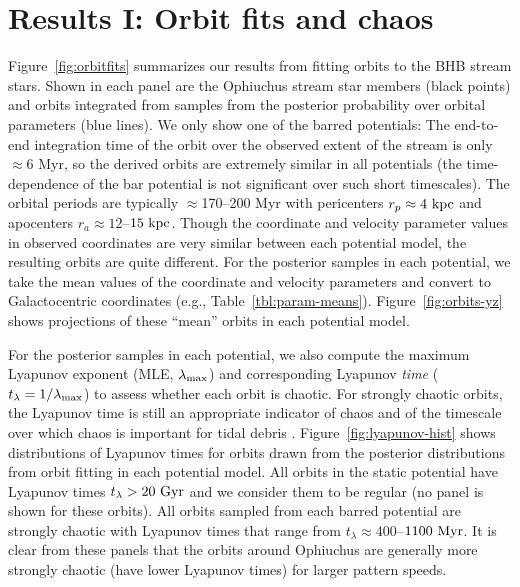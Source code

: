 \documentclass[letterpaper,12pt,preprint]{aastex}
\newcommand{\lyapexp}{\lambda_{\rm max}}
\newcommand{\lyapt}{t_\lambda}
\begin{document}
\section{Results I: Orbit fits and chaos}\label{sec:results1}

Figure~\ref{fig:orbitfits} summarizes our results from fitting orbits to the BHB stream stars. Shown in each panel are the Ophiuchus stream star members (black points) and orbits integrated from samples from the posterior probability over orbital parameters (blue lines). We only show one of the barred potentials: The end-to-end integration time of the orbit over the observed extent of the stream is only $\approx$6 Myr, so the derived orbits are extremely similar in all potentials (the time-dependence of the bar potential is not significant over such short timescales). The orbital periods are typically $\approx$170--200 Myr with pericenters $r_p \approx 4~{\rm kpc}$ and apocenters $r_a \approx 12$--$15~{\rm kpc}$. Though the coordinate and velocity parameter values in observed coordinates are very similar between each potential model, the resulting orbits are quite different. For the posterior samples in each potential, we take the mean values of the coordinate and velocity parameters and convert to Galactocentric coordinates (e.g., Table~\ref{tbl:param-means}). Figure~\ref{fig:orbits-yz} shows projections of these ``mean'' orbits in each potential model.

For the posterior samples in each potential, we also compute the maximum Lyapunov exponent (MLE, $\lyapexp$) and corresponding Lyapunov \emph{time} ($\lyapt = 1/\lyapexp$) to assess whether each orbit is chaotic. For strongly chaotic orbits, the Lyapunov time is still an appropriate indicator of chaos and of the timescale over which chaos is important for tidal debris \citep{apw15-chaos}. Figure~\ref{fig:lyapunov-hist} shows distributions of Lyapunov times for orbits drawn from the posterior distributions from orbit fitting in each potential model. All orbits in the static potential have Lyapunov times $\lyapt > 20~{\rm Gyr}$ and we consider them to be regular (no panel is shown for these orbits). All orbits sampled from each barred potential are strongly chaotic with Lyapunov times that range from $\lyapt \approx 400$--$1100~{\rm Myr}$. It is clear from these panels that the orbits around Ophiuchus are generally more strongly chaotic (have lower Lyapunov times) for larger pattern speeds. 
\end{document}
